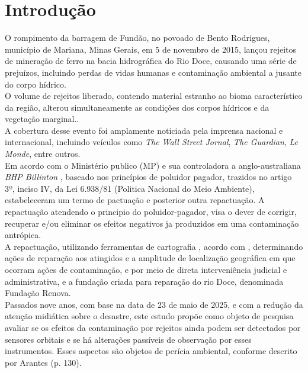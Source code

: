 
\section{Introdução}

\hspace*{1.25 cm} O rompimento da barragem de Fundão, no povoado de Bento Rodrigues, município de Mariana, Minas Gerais, em 5 de novembro de 2015, lançou rejeitos de mineração de ferro na bacia hidrográfica do Rio Doce, causando uma série de prejuízos, incluindo perdas de vidas humanas e contaminação ambiental a jusante do corpo hídrico. \\
%
\hspace*{1.25 cm} O volume de rejeitos liberado, contendo material estranho ao bioma característico da região, alterou simultaneamente as condições dos corpos hídricos e da vegetação marginal..\\
%
\hspace*{1.25 cm}A cobertura desse evento foi amplamente noticiada pela imprensa nacional e internacional, incluindo veículos como \textit{The Wall Street Jornal}, \textit{The Guardian}, \textit{Le Monde}, entre outros.\\
%
\hspace*{1.25 cm} Em acordo com o Ministério publico (MP) e sua controladora a anglo-australiana  \textit{BHP Billinton} ,  baseado nos princípios de poluidor pagador, trazidos no artigo 3º, inciso IV, da Lei 6.938/81 (Politica Nacional do Meio Ambiente), estabeleceram um termo de pactuação e posterior outra repactuação.  A repactuação atendendo o principio do poluidor-pagador, visa o dever de corrigir, recuperar e/ou eliminar os efeitos negativos ja produzidos em uma contaminação antrópica. \\
% 
\hspace*{1.25 cm}  A repactuação, utilizando ferramentas de cartografia , acordo com \cite[p~79]{Magri}, determinando ações de reparação aos atingidos e a  amplitude de localização geográfica em que ocorram ações de contaminação, e  por meio de direta interveniência  judicial e administrativa, e a fundação criada para reparação do rio Doce, denominada Fundação Renova.\\
\hspace*{1.25 cm} Passados nove anos, com base na data de 23 de maio de 2025, e com a redução da atenção midiática sobre o desastre, este estudo propõe como objeto de pesquisa avaliar se os efeitos da contaminação por rejeitos ainda podem ser detectados por sensores orbitais e se há alterações passíveis de observação por esses instrumentos. Esses aspectos são objetos de perícia ambiental, conforme descrito por Arantes (p. 130). \cite[p.130]{Arantes} \\
